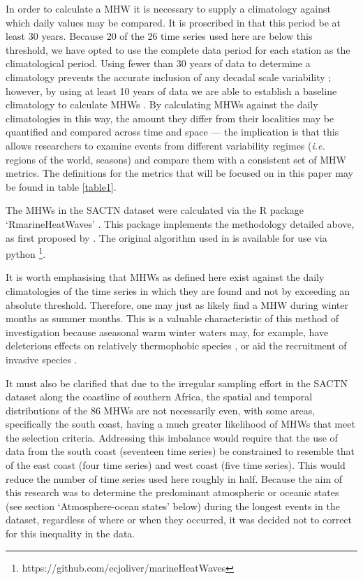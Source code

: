 \documentclass[utf8]{frontiersSCNS}
\begin{document}
In order to calculate a MHW it is necessary to supply a climatology against which daily values may be compared. It is proscribed in \citet{Hobday2016} that this period be at least 30 years. Because 20 of the 26 time series used here are below this threshold, we have opted to use the complete data period for each station as the climatological period. Using fewer than 30 years of data to determine a climatology prevents the accurate inclusion of any decadal scale variability \citep{Schlegel2016}; however, by using at least 10 years of data we are able to establish a baseline climatology to calculate MHWs \citep{Schlegel2017}. By calculating MHWs against the daily climatologies in this way, the amount they differ from their localities may be quantified and compared across time and space --- the implication is that this allows researchers to examine events from different variability regimes (\emph{i.e.} regions of the world, seasons) and compare them with a consistent set of MHW metrics. The definitions for the metrics that will be focused on in this paper may be found in table \ref{table1}.




The MHWs in the SACTN dataset were calculated via the R package `RmarineHeatWaves' \citep{Smit2017}. This package implements the methodology detailed above, as first proposed by \citet{Hobday2016}. The original algorithm used in \citet{Hobday2016} is available for use via python \footnote{https://github.com/ecjoliver/marineHeatWaves}.

It is worth emphasising that MHWs as defined here exist against the daily climatologies of the time series in which they are found and not by exceeding an absolute threshold. Therefore, one may just as likely find a MHW during winter months as summer months. This is a valuable characteristic of this method of investigation because aseasonal warm winter waters may, for example, have deleterious effects on relatively thermophobic species \citep{Wernberg2011}, or aid the recruitment of invasive species \citep{Stachowicz2002}.

It must also be clarified that due to the irregular sampling effort in the SACTN dataset along the coastline of southern Africa, the spatial and temporal distributions of the 86 MHWs are not necessarily even, with some areas, specifically the south coast, having a much greater likelihood of MHWs that meet the selection criteria. Addressing this imbalance would require that the use of data from the south coast (seventeen time series) be constrained to resemble that of the east coast (four time series) and west coast (five time series). This would reduce the number of time series used here roughly in half. Because the aim of this research was to determine the predominant atmospheric or oceanic states (see section `Atmosphere-ocean states' below) during the longest events in the dataset, regardless of where or when they occurred, it was decided not to correct for this inequality in the data.
\end{document}
